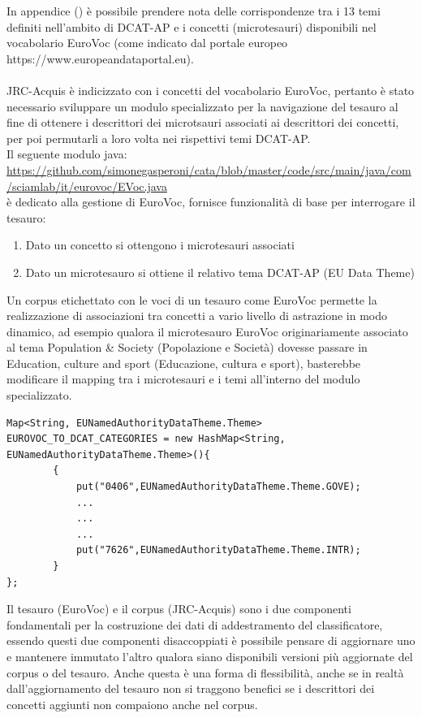 \documentclass{article}
\theoremstyle{plain}
\theoremstyle{definition}
\begin{document}
In appendice () è possibile prendere nota delle corrispondenze tra i 13 temi definiti nell'ambito di DCAT-AP e i concetti (microtesauri) disponibili nel vocabolario EuroVoc (come indicato dal portale europeo https://www.europeandataportal.eu).
\\
\\
JRC-Acquis è indicizzato con i concetti del vocabolario EuroVoc, pertanto è stato necessario sviluppare un modulo specializzato per la navigazione del tesauro al fine di ottenere i descrittori dei microtsauri associati ai descrittori dei concetti, per poi permutarli a loro volta nei rispettivi temi DCAT-AP.
\\
Il seguente modulo java:
\url{https://github.com/simonegasperoni/cata/blob/master/code/src/main/java/com/sciamlab/it/eurovoc/EVoc.java}
\\
è dedicato alla gestione di EuroVoc, fornisce funzionalità di base per interrogare il tesauro:
\begin{enumerate}
\item Dato un concetto si ottengono i microtesauri associati
\item Dato un microtesauro si ottiene il relativo tema DCAT-AP (EU Data Theme) 
\end{enumerate}

Un corpus etichettato con le voci di un tesauro come EuroVoc permette la realizzazione di associazioni tra concetti a vario livello di astrazione in modo dinamico, ad esempio qualora il microtesauro EuroVoc  originariamente associato al tema Population \& Society (Popolazione e Società) dovesse passare in Education, culture and sport (Educazione, cultura e sport), basterebbe modificare il mapping tra i microtesauri e i temi all'interno del modulo specializzato.
\begin{lstlisting}
Map<String, EUNamedAuthorityDataTheme.Theme> EUROVOC_TO_DCAT_CATEGORIES = new HashMap<String, EUNamedAuthorityDataTheme.Theme>(){
		{
			put("0406",EUNamedAuthorityDataTheme.Theme.GOVE); 		
			...
			...
			...
			put("7626",EUNamedAuthorityDataTheme.Theme.INTR); 	
		}
};
\end{lstlisting}

Il tesauro (EuroVoc) e il corpus (JRC-Acquis) sono i due componenti fondamentali per la costruzione dei dati di addestramento del classificatore, essendo questi due componenti disaccoppiati è possibile pensare di aggiornare uno e mantenere immutato l'altro qualora siano disponibili versioni più aggiornate del corpus o del tesauro. Anche questa è una forma di flessibilità, anche se in realtà dall'aggiornamento del tesauro non si traggono benefici se i descrittori dei concetti aggiunti non compaiono anche nel corpus. 
\end{document}

